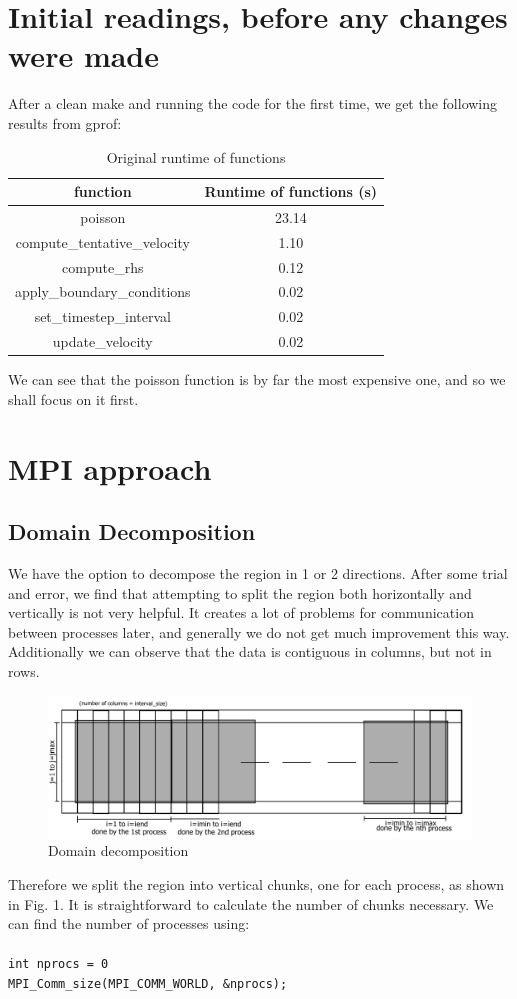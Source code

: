 \documentclass[11pt,journal]{article}
\newcommand\tab[1][1cm]{\hspace*{#1}}
\begin{document}
	\section{Initial readings, before any changes were made}
	After a clean make and running the code for the first time, we get the following results from gprof:
	\begin{table}[h]
		\centering
		\begin{tabular}{c|c}
			function & Runtime of functions (s) \\
			\hline
			poisson & 23.14 \\
			compute\_tentative\_velocity & 1.10 \\
			compute\_rhs & 0.12 \\
			apply\_boundary\_conditions & 0.02 \\
			set\_timestep\_interval & 0.02 \\
			update\_velocity & 0.02\\
		\end{tabular}
		\caption{Original runtime of functions}
	\end{table}

	We can see that the poisson function is by far the most expensive one, and so we shall focus on it first.
	
	\section{MPI approach}
	\subsection{Domain Decomposition}
	
	We have the option to decompose the region in 1 or 2 directions. After some trial and error, we find that attempting to split the region both horizontally and vertically is not very helpful. It creates a lot of problems for communication between processes later, and generally we do not get much improvement this way. Additionally we can observe that the data is contiguous in columns, but not in rows.
	
	\begin{figure}[h]
		\centering
		\includegraphics[scale=0.6]{HPC_diag1.png}
		\caption{Domain decomposition}
	\end{figure}
	Therefore we split the region into vertical chunks, one for each process, as shown in Fig. 1. It is straightforward to calculate the number of chunks necessary. We can find the number of processes using:\\
	\tab\\
	\tab \texttt{int nprocs = 0}\\
	\tab \texttt{MPI\_Comm\_size(MPI\_COMM\_WORLD, \&nprocs);}
	
\end{document}
